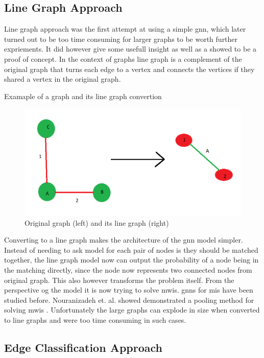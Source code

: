 \subsection{Line Graph Approach}

Line graph approach was the first attempt at using a simple \gls{gnn}, which later turned out to be too time consuming for larger graphs to be worth further expriements. It did however give some usefull insight as well as a showed to be a proof of concept. In the context of graphs line graph is a complement of the original graph that turns each edge to a vertex and connects the vertices if they shared a vertex in the original graph. 

Examaple of a graph and its line graph convertion
\begin{figure}[H]
    \centering
    \includegraphics[scale=0.5]{figures/LineGraphExample}
    \caption{Original graph (left) and its line graph (right)}
    \label{Line graph figure}
\end{figure}

Converting to a line graph makes the architecture of the \gls{gnn} model simpler. Instead of needing to ask model for each pair of nodes is they should be matched together, the line graph model now can output the probability of a node being in the matching directly, since the node now represents two connected nodes from original graph. This also however transforms the problem itself. From the perspective og the model it is now trying to solve \gls{mwis}. \gls{gnn}s for \gls{mis} have been studied before. Nouranizadeh et. al. showed demonstrated a pooling method for solving \gls{mwis} \cite{DBLPjournals/corr/abs-2107-01410}. Unfortunately the large graphs can explode in size when converted to line graphs and were too time consuming in such cases.

\subsection{Edge Classification Approach}

